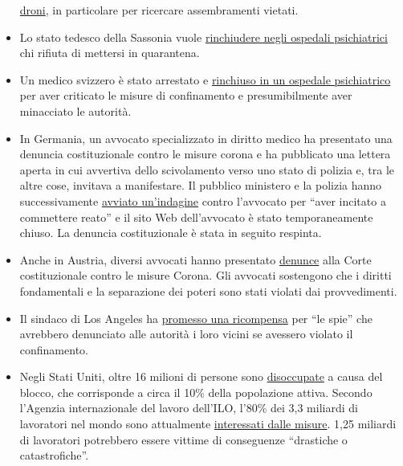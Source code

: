\begin{itemize}
  \href{https://rp-online.de/nrw/panorama/nrw-polizei-testet-drohnen-bei-einsaetzen-wegen-corona-massnahmen_aid-50006143}{droni},
  in particolare per ricercare assembramenti vietati.
\item
   Lo stato tedesco della Sassonia vuole
  \href{https://www.welt.de/politik/deutschland/article207198029/Coronavirus-Sachsen-will-Quarantaene-Verweigerer-in-Psychiatrien-sperren.html}{rinchiudere
  negli ospedali psichiatrici} chi rifiuta di mettersi in quarantena.
\item
  Un medico svizzero è stato arrestato e
  \href{https://www.blick.ch/news/schweiz/mittelland/in-baden-ag-polizei-in-vollmontur-im-einsatz-id15841510.html}{rinchiuso
  in un ospedale psichiatrico} per aver criticato le misure di
  confinamento e presumibilmente aver minacciato le autorità.
\item
  In Germania, un avvocato specializzato in diritto medico ha presentato
  una denuncia costituzionale contro le misure corona e ha pubblicato
  una lettera aperta in cui avvertiva dello scivolamento verso uno stato
  di polizia e, tra le altre cose, invitava a manifestare. Il pubblico
  ministero e la polizia hanno successivamente
  \href{https://www.morgenweb.de/mannheimer-morgen_artikel,-coronavirus-aufruf-zu-straftaten-ermittlungen-gegen-heidelberger-rechtsanwaeltin-_arid,1627078.html}{avviato
  un'indagine} contro l'avvocato per ``aver incitato a commettere
  reato'' e il sito Web dell'avvocato è stato temporaneamente chiuso. La
  denuncia costituzionale è stata in seguito respinta.
\item
  Anche in Austria, diversi avvocati hanno presentato
  \href{https://wien.orf.at/stories/3043172/}{denunce} alla Corte
  costituzionale contro le misure Corona. Gli avvocati sostengono che i
  diritti fondamentali e la separazione dei poteri sono stati violati
  dai provvedimenti.
\item
  Il sindaco di Los Angeles ha
  \href{https://townhall.com/tipsheet/bethbaumann/2020/04/04/la-mayor-garcetti-says-snitches-get-rewards-for-ratting-out-their-neighbors-n2566348}{promesso
  una ricompensa} per ``le spie'' che avrebbero denunciato alle autorità
  i loro vicini se avessero violato il confinamento.
\item
  Negli Stati Uniti, oltre 16 milioni di persone sono
  \href{https://www.nytimes.com/2020/04/09/us/coronavirus-us-news.html}{disoccupate}
  a causa del blocco, che corrisponde a circa il 10\% della popolazione
  attiva. Secondo l'Agenzia internazionale del lavoro dell'ILO, l'80\%
  dei 3,3 miliardi di lavoratori nel mondo sono attualmente
  \href{https://www.ilo.org/global/about-the-ilo/newsroom/news/WCMS_740893/lang--en/index.htm}{interessati
  dalle misure}. 1,25 miliardi di lavoratori potrebbero essere vittime
  di conseguenze ``drastiche o catastrofiche''.
\end{itemize}

